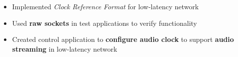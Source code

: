 \begin{itemize}
\begin{itemize}
	    	\begin{itemize}\itemsep \isep
	    	\item Implemented \textit{Clock Reference Format} for low-latency network
	    	\item Used \textbf{raw sockets} in test applications to verify functionality
	    	\item Created control application to \textbf{configure audio clock} to support \textbf{audio streaming} in low-latency network
	    	\end{itemize}

	\end{itemize}
\end{itemize}
